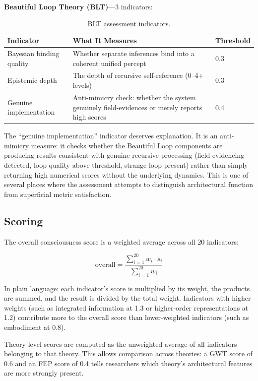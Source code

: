 \textbf{Beautiful Loop Theory (BLT)}---3 indicators:

\begin{table}[t]
\centering
\begin{tabular}{p{3.5cm}p{7.5cm}l}
\toprule
\textbf{Indicator} & \textbf{What It Measures} & \textbf{Threshold} \\
\midrule
Bayesian binding quality & Whether separate inferences bind into a coherent unified percept & 0.3 \\
Epistemic depth & The depth of recursive self-reference (0--4+ levels) & 0.3 \\
Genuine implementation & Anti-mimicry check: whether the system genuinely field-evidences or merely reports high scores & 0.4 \\
\bottomrule
\end{tabular}
\caption{BLT assessment indicators.}
\label{tab:indicators-blt}
\end{table}

The ``genuine implementation'' indicator deserves explanation. It is an anti-mimicry measure: it checks whether the Beautiful Loop components are producing results consistent with genuine recursive processing (field-evidencing detected, loop quality above threshold, strange loop present) rather than simply returning high numerical scores without the underlying dynamics. This is one of several places where the assessment attempts to distinguish architectural function from superficial metric satisfaction.

\subsection{Scoring}

The overall consciousness score is a weighted average across all 20 indicators:

\begin{equation}
\text{overall} = \frac{\sum_{i=1}^{20} w_i \cdot s_i}{\sum_{i=1}^{20} w_i}
\label{eq:overall-score}
\end{equation}

In plain language: each indicator's score is multiplied by its weight, the products are summed, and the result is divided by the total weight. Indicators with higher weights (such as integrated information at 1.3 or higher-order representations at 1.2) contribute more to the overall score than lower-weighted indicators (such as embodiment at 0.8).

Theory-level scores are computed as the unweighted average of all indicators belonging to that theory. This allows comparison across theories: a GWT score of 0.6 and an FEP score of 0.4 tells researchers which theory's architectural features are more strongly present.

